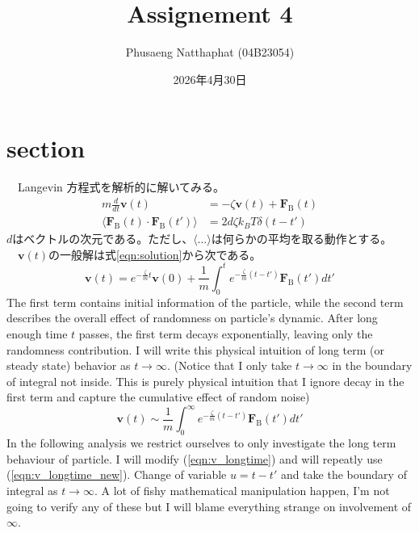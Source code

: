 \documentclass[10pt]{article}
\title{Assignement 4}
\author{Phusaeng Natthaphat (04B23054)}
\date{2026年4月30日}
\begin{document}
\maketitle

\section{section}
　Langevin 方程式を解析的に解いてみる。
\begin{equation}\label{eqn:Langevin}
    \begin{split}
        m\frac{d}{dt}\mathbf{v}(t)&=-\zeta\mathbf{v}(t)+\mathbf{F}_{\text{B}}(t)\\
        \langle\mathbf{F}_{\text{B}}(t)\cdot\mathbf{F}_{\text{B}}(t')\rangle&=2d\zeta k_BT\delta(t-t')
    \end{split}
\end{equation}
$d$はベクトルの次元である。ただし、$\langle\ldots\rangle$は何らかの平均を取る動作とする。\\
　$\mathbf{v}(t)$の一般解は式\ref{eqn:solution}から次である。
\begin{equation}
    \mathbf{v}(t)=e^{-\frac{\zeta}{m}t}\mathbf{v}(0)+\frac{1}{m}\int_{0}^{t}e^{-\frac{\zeta}{m}(t-t')}\mathbf{F}_\text{B}(t')dt'
\end{equation}
\hspace*{\parindent} The first term contains initial information of the particle, while the second term describes the overall effect of randomness on
particle's dynamic. After long enough time $t$ passes, the first term decays exponentially, leaving only the randomness contribution. I will write this physical intuition of
long term (or steady state) behavior as $t\rightarrow\infty$. (Notice that I only take $t\rightarrow\infty$ in the boundary of integral not inside.
This is purely physical intuition that I ignore decay in the first term and capture the cumulative effect of random noise)
\begin{equation}\label{eqn:v_longtime}
    \mathbf{v}(t)\sim\frac{1}{m}\int_{0}^{\infty}e^{-\frac{\zeta}{m}(t-t')}\mathbf{F}_\text{B}(t')dt'
\end{equation}
\hspace*{\parindent} In the following analysis we restrict ourselves to only investigate the long term behaviour of particle. I will modify (\ref{eqn:v_longtime}) and will
repeatly use (\ref{eqn:v_longtime_new}). Change of variable $u=t-t'$ and take the boundary of integral as $t\rightarrow\infty$.
A lot of fishy mathematical manipulation happen, I'm not going to verify any of these but I will blame everything strange on involvement of $\infty$.
\end{document}
